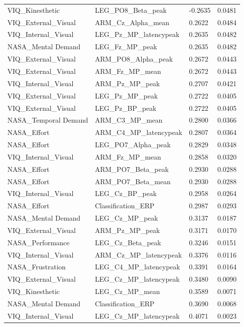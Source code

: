 \documentclass[10pt,letterpaper]{article}
\begin{document}
\begin{longtable}{@{}llll@{}}
VIQ\_Kinesthetic & LEG\_PO8\_Beta\_peak & -0.2635 & 0.0481 \\
\rowcolor[HTML]{EFEFEF} 
VIQ\_External\_Visual & ARM\_Cz\_Alpha\_mean & 0.2622 & 0.0484 \\
VIQ\_Internal\_Visual & LEG\_Pz\_MP\_latencypeak & 0.2635 & 0.0482 \\
\rowcolor[HTML]{EFEFEF} 
NASA\_Mental Demand & LEG\_Fz\_MP\_peak & 0.2635 & 0.0482 \\
VIQ\_External\_Visual & ARM\_PO8\_Alpha\_peak & 0.2672 & 0.0443 \\
\rowcolor[HTML]{EFEFEF} 
VIQ\_External\_Visual & ARM\_Fz\_MP\_mean & 0.2672 & 0.0443 \\
VIQ\_Internal\_Visual & ARM\_Pz\_MP\_peak & 0.2707 & 0.0421 \\
\rowcolor[HTML]{EFEFEF} 
VIQ\_External\_Visual & LEG\_Pz\_MP\_peak & 0.2722 & 0.0405 \\
VIQ\_External\_Visual & LEG\_Pz\_BP\_peak & 0.2722 & 0.0405 \\
\rowcolor[HTML]{EFEFEF} 
NASA\_Temporal Demand & ARM\_C3\_MP\_mean & 0.2800 & 0.0366 \\
NASA\_Effort & ARM\_C4\_MP\_latencypeak & 0.2807 & 0.0364 \\
\rowcolor[HTML]{EFEFEF} 
NASA\_Effort & LEG\_PO7\_Alpha\_peak & 0.2829 & 0.0348 \\
VIQ\_Internal\_Visual & ARM\_Fz\_MP\_mean & 0.2858 & 0.0320 \\
\rowcolor[HTML]{EFEFEF} 
NASA\_Effort & ARM\_PO7\_Beta\_peak & 0.2930 & 0.0288 \\
NASA\_Effort & ARM\_PO7\_Beta\_mean & 0.2930 & 0.0288 \\
\rowcolor[HTML]{EFEFEF} 
VIQ\_Internal\_Visual & LEG\_Cz\_BP\_peak & 0.2958 & 0.0264 \\
NASA\_Effort & Classification\_ERP & 0.2987 & 0.0293 \\
\rowcolor[HTML]{EFEFEF} 
NASA\_Mental Demand & LEG\_Cz\_MP\_peak & 0.3137 & 0.0187 \\
VIQ\_External\_Visual & ARM\_Pz\_MP\_peak & 0.3171 & 0.0170 \\
\rowcolor[HTML]{EFEFEF} 
NASA\_Performance & LEG\_Cz\_Beta\_peak & 0.3246 & 0.0151 \\
VIQ\_Internal\_Visual & ARM\_Cz\_MP\_latencypeak & 0.3376 & 0.0116 \\
\rowcolor[HTML]{EFEFEF} 
NASA\_Frustration & LEG\_C4\_MP\_latencypeak & 0.3391 & 0.0164 \\
VIQ\_External\_Visual & LEG\_Cz\_MP\_latencypeak & 0.3480 & 0.0090 \\
\rowcolor[HTML]{EFEFEF} 
VIQ\_Kinesthetic & LEG\_Cz\_MP\_mean & 0.3589 & 0.0071 \\
NASA\_Mental Demand & Classification\_ERP & 0.3690 & 0.0068 \\
\rowcolor[HTML]{EFEFEF} 
VIQ\_Internal\_Visual & LEG\_Cz\_MP\_latencypeak & 0.4071 & 0.0023 \\ \bottomrule
\end{longtable}
\end{document}
